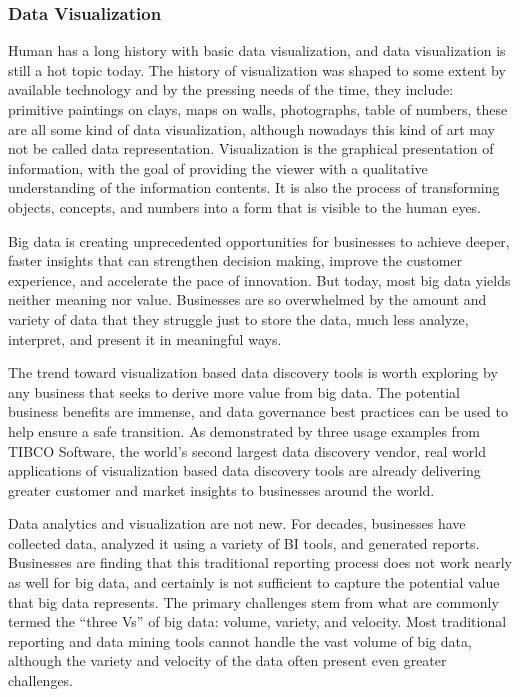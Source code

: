 \subsubsection{Data Visualization}
Human has a long history with basic data visualization, and data visualization is still a hot topic today. The history of visualization was shaped to some extent by available technology and by the pressing needs of the time, they include: primitive paintings on clays, maps on walls, photographs, table of numbers, these are all some kind of data visualization, although nowadays this kind of art may not be called data representation. Visualization is the graphical presentation of information, with the goal of providing the viewer with a qualitative understanding of the information contents. It is also the process of transforming objects, concepts, and numbers into a form that is visible to the human eyes.

Big data is creating unprecedented opportunities for businesses to achieve deeper, faster insights that can strengthen decision making, improve the customer experience, and accelerate the pace of innovation. But today, most big data yields neither meaning nor value. Businesses are so overwhelmed by the amount and variety of data that they struggle just to store the data, much less analyze, interpret, and present it in meaningful ways.

The trend toward visualization based data discovery tools is worth exploring by any business that seeks to derive more value from big data. The potential business benefits are immense, and data governance best practices can be used to help ensure a safe transition. As demonstrated by three usage examples from TIBCO Software, the world’s second largest data discovery vendor, real world applications of visualization based data discovery tools are already delivering greater customer and market insights to businesses around the world.

Data analytics and visualization are not new. For decades, businesses have collected data, analyzed it using a variety of BI tools, and generated reports. Businesses are finding that this traditional reporting process does not work nearly as well for big data, and certainly is not sufficient to capture the potential value that big data represents. The primary challenges stem from what are commonly termed the “three Vs” of big data: volume, variety, and velocity. Most traditional reporting and data mining tools cannot handle the vast volume of big data, although the variety and velocity of the data often present even greater challenges.

